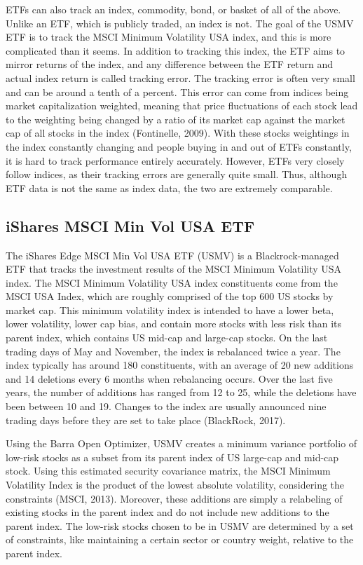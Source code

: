 \documentclass[12pt,twoside]{reedthesis}
\theoremstyle{definition}
\theoremstyle{definition}
\theoremstyle{definition}
\theoremstyle{remark}
\begin{document}
ETFs can also track an index, commodity, bond, or basket of all of the
above. Unlike an ETF, which is publicly traded, an index is not. The
goal of the USMV ETF is to track the MSCI Minimum Volatility USA index,
and this is more complicated than it seems. In addition to tracking this
index, the ETF aims to mirror returns of the index, and any difference
between the ETF return and actual index return is called tracking error.
The tracking error is often very small and can be around a tenth of a
percent. This error can come from indices being market capitalization
weighted, meaning that price fluctuations of each stock lead to the
weighting being changed by a ratio of its market cap against the market
cap of all stocks in the index (Fontinelle, 2009). With these stocks
weightings in the index constantly changing and people buying in and out
of ETFs constantly, it is hard to track performance entirely accurately.
However, ETFs very closely follow indices, as their tracking errors are
generally quite small. Thus, although ETF data is not the same as index
data, the two are extremely comparable.

\subsection{iShares MSCI Min Vol USA
ETF}\label{ishares-msci-min-vol-usa-etf}

The iShares Edge MSCI Min Vol USA ETF (USMV) is a Blackrock-managed ETF
that tracks the investment results of the MSCI Minimum Volatility USA
index. The MSCI Minimum Volatility USA index constituents come from the
MSCI USA Index, which are roughly comprised of the top 600 US stocks by
market cap. This minimum volatility index is intended to have a lower
beta, lower volatility, lower cap bias, and contain more stocks with
less risk than its parent index, which contains US mid-cap and large-cap
stocks. On the last trading days of May and November, the index is
rebalanced twice a year. The index typically has around 180
constituents, with an average of 20 new additions and 14 deletions every
6 months when rebalancing occurs. Over the last five years, the number
of additions has ranged from 12 to 25, while the deletions have been
between 10 and 19. Changes to the index are usually announced nine
trading days before they are set to take place (BlackRock, 2017).

Using the Barra Open Optimizer, USMV creates a minimum variance
portfolio of low-risk stocks as a subset from its parent index of US
large-cap and mid-cap stock. Using this estimated security covariance
matrix, the MSCI Minimum Volatility Index is the product of the lowest
absolute volatility, considering the constraints (MSCI, 2013). Moreover,
these additions are simply a relabeling of existing stocks in the parent
index and do not include new additions to the parent index. The low-risk
stocks chosen to be in USMV are determined by a set of constraints, like
maintaining a certain sector or country weight, relative to the parent
index.
\end{document}
